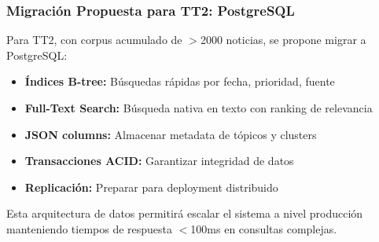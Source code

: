 \subsubsection{Migración Propuesta para TT2: PostgreSQL}
\label{subsubsec:postgresql_tt2}

Para TT2, con corpus acumulado de $>$2000 noticias, se propone migrar a PostgreSQL:

\begin{itemize}
    \item \textbf{Índices B-tree:} Búsquedas rápidas por fecha, prioridad, fuente
    \item \textbf{Full-Text Search:} Búsqueda nativa en texto con ranking de relevancia
    \item \textbf{JSON columns:} Almacenar metadata de tópicos y clusters
    \item \textbf{Transacciones ACID:} Garantizar integridad de datos
    \item \textbf{Replicación:} Preparar para deployment distribuido
\end{itemize}

Esta arquitectura de datos permitirá escalar el sistema a nivel producción manteniendo tiempos de respuesta $<$100ms en consultas complejas.